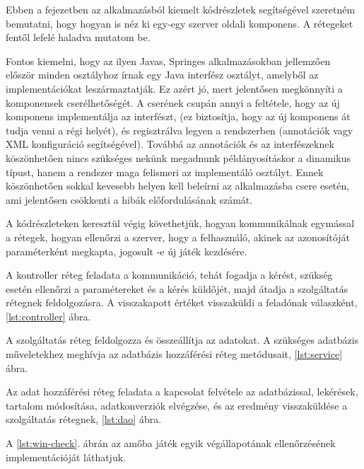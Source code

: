 Ebben a fejezetben az alkalmazásból kiemelt kódrészletek segítségével szeretném bemutatni, hogy hogyan is néz ki egy-egy szerver oldali komponens. A rétegeket fentől lefelé haladva mutatom be.

Fontos kiemelni, hogy az ilyen Javas, Springes alkalmazásokban jellemzően először minden osztályhoz írnak egy Java interfész osztályt, amelyből az implementációkat leszármaztatják. Ez azért jó, mert jelentősen megkönnyíti a komponensek cserélhetőségét. A cserének csupán annyi a feltétele, hogy az új komponens implementálja az interfészt, (ez biztosítja, hogy az új komponens át tudja venni a régi helyét), és regisztrálva legyen a rendszerben (annotációk vagy XML konfiguráció segítségével). Továbbá az annotációk és az interfészeknek köszönhetően nincs szükséges nekünk megadnunk példányosításkor a dinamikus típust, hanem a rendszer maga felismeri az implementáló osztályt. Ennek köszönhetően sokkal kevesebb helyen kell beleírni az alkalmazásba csere esetén, ami jelentősen csökkenti a hibák előfordulásának számát.

A kódrészleteken keresztül végig követhetjük, hogyan kommunikálnak egymással a rétegek, hogyan ellenőrzi a szerver, hogy a felhasználó, akinek az azonosítóját paraméterként megkapta, jogosult -e új játék kezdésére.

A kontroller réteg feladata a kommunikáció, tehát fogadja a kérést, szükség esetén ellenőrzi a paramétereket és a kérés küldőjét, majd átadja a szolgáltatás rétegnek feldolgozásra. A visszakapott értéket visszaküldi a feladónak válaszként, \ref{lst:controller} ábra.


A szolgáltatás réteg feldolgozza és összeállítja az adatokat. A szükséges adatbázis műveletekhez meghívja az adatbázis hozzáférési réteg metódusait, \ref{lst:service} ábra.


Az adat hozzáférési réteg feladata a kapcsolat felvétele az adatbázissal, lekérések, tartalom módosítása, adatkonverziók elvégzése, és az eredmény visszaküldése a szolgáltatás rétegnek,  \ref{lst:dao} ábra.


A \ref{lst:win-check}. ábrán az amőba játék egyik végállapotának ellenőrzésének implementációját láthatjuk.


